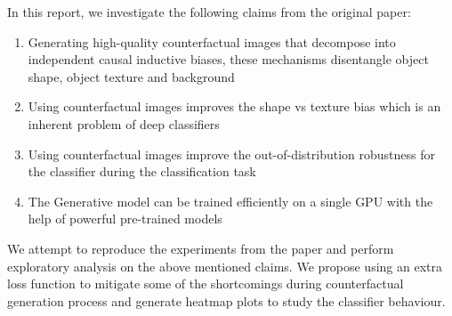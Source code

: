 In this report, we investigate the following claims from the original paper:
\begin{enumerate}
    \item Generating high-quality counterfactual images that decompose into independent causal inductive biases, these mechanisms disentangle object shape, object texture and background
    \item Using counterfactual images improves the shape vs texture bias which is an inherent problem of deep classifiers
    \item Using counterfactual images improve the out-of-distribution robustness for the classifier during the classification task 
    \item The Generative model can be trained efficiently on a single GPU with the help of powerful pre-trained models
    
\end{enumerate}    

We attempt to reproduce the experiments from the paper \cite{sauer2021counterfactual} and perform exploratory analysis on the above mentioned claims. We propose using an extra loss function to mitigate some of the shortcomings during counterfactual generation process and generate heatmap plots to study the classifier behaviour. 



